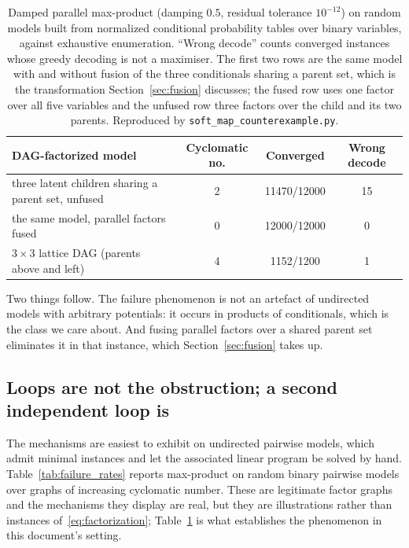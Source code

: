 \begin{table}[h]
    \centering
    \small
    \begin{tabular}{@{}p{6.2cm}ccc@{}}
        \toprule
        \textbf{DAG-factorized model} & \textbf{Cyclomatic no.} & \textbf{Converged} & \textbf{Wrong decode} \\
        \midrule
        three latent children sharing a parent set, unfused & 2 & 11470/12000 & 15 \\
        the same model, parallel factors fused              & 0 & 12000/12000 & 0 \\
        $3\times3$ lattice DAG (parents above and left)     & 4 & 1152/1200   & 1 \\
        \bottomrule
    \end{tabular}
    \caption{Damped parallel max-product (damping $0.5$, residual tolerance $10^{-12}$) on random models built from normalized conditional probability tables over binary variables, against exhaustive enumeration. ``Wrong decode'' counts converged instances whose greedy decoding is not a maximiser. The first two rows are the same model with and without fusion of the three conditionals sharing a parent set, which is the transformation Section~\ref{sec:fusion} discusses; the fused row uses one factor over all five variables and the unfused row three factors over the child and its two parents. Reproduced by \texttt{soft\_map\_counterexample.py}.}
    \label{tab:dag_failures}
\end{table}

Two things follow. The failure phenomenon is not an artefact of undirected models with arbitrary potentials: it occurs in products of conditionals, which is the class we care about. And fusing parallel factors over a shared parent set eliminates it in that instance, which Section~\ref{sec:fusion} takes up.

\subsection{Loops are not the obstruction; a second independent loop is}

The mechanisms are easiest to exhibit on undirected pairwise models, which admit minimal instances and let the associated linear program be solved by hand. Table~\ref{tab:failure_rates} reports max-product on random binary pairwise models over graphs of increasing cyclomatic number. These are legitimate factor graphs and the mechanisms they display are real, but they are illustrations rather than instances of~\eqref{eq:factorization}; Table~\ref{tab:dag_failures} is what establishes the phenomenon in this document's setting.

